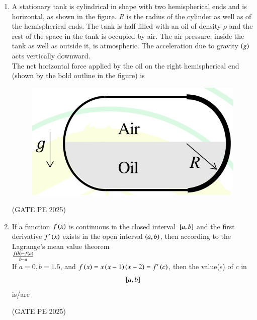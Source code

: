 \documentclass[journal,12pt,onecolumn]{IEEEtran}
\theoremstyle{remark}
\begin{document}
\begin{enumerate}
\item A stationary tank is cylindrical in shape with two hemispherical ends and is horizontal, as shown in the figure. $R$ is the radius of the cylinder as well as of the hemispherical ends. The tank is half filled with an oil of density $\rho$ and the rest of the space in the tank is occupied by air. The air pressure, inside the tank as well as outside it, is atmospheric. The acceleration due to gravity $\left(g\right)$ acts vertically
downward.\\
The net horizontal force applied by the oil on the right hemispherical end (shown by the bold outline in the figure) is
\begin{figure}[H]
    \centering
    \includegraphics[width=0.5\columnwidth]{25Q43.png}
    \caption{}
    \label{fig:placeholder}
\end{figure}
\begin{enumerate}
\end{enumerate}
\hfill{(GATE PE 2025)}

\item If a function $f\left(x\right)$ is continuous in the closed interval ${}\left[a,b\right]$ and the first derivative $f'\left(x\right)$ exists in the open interval $\left(a,b\right)$, then according to the Lagrange's mean value theorem\\
$\frac{f\left(b\right)-f\left(a\right)}{b-a}$\\
If $a=0, b=1.5$, and $f\left(x\right)=x\left(x-1\right)\left(x-2\right)=f'\left(c\right)$, then the value(s) of $c$ in $${}\left[a,b\right]$$ is/are
\begin{enumerate}
\end{enumerate}
\hfill{(GATE PE 2025)}


\end{enumerate}
\end{document}
